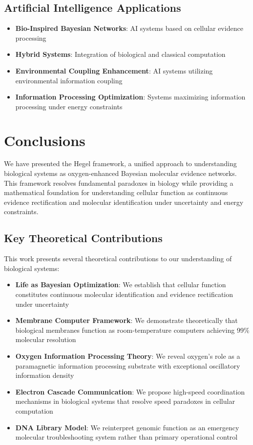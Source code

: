 \documentclass[12pt,a4paper]{article}
\begin{document}
\subsection{Artificial Intelligence Applications}

\begin{itemize}
\item \textbf{Bio-Inspired Bayesian Networks}: AI systems based on cellular evidence processing
\item \textbf{Hybrid Systems}: Integration of biological and classical computation
\item \textbf{Environmental Coupling Enhancement}: AI systems utilizing environmental information coupling
\item \textbf{Information Processing Optimization}: Systems maximizing information processing under energy constraints
\end{itemize}

\section{Conclusions}

We have presented the Hegel framework, a unified approach to understanding biological systems as oxygen-enhanced Bayesian molecular evidence networks. This framework resolves fundamental paradoxes in biology while providing a mathematical foundation for understanding cellular function as continuous evidence rectification and molecular identification under uncertainty and energy constraints.

\subsection{Key Theoretical Contributions}

This work presents several theoretical contributions to our understanding of biological systems:

\begin{itemize}
\item \textbf{Life as Bayesian Optimization}: We establish that cellular function constitutes continuous molecular identification and evidence rectification under uncertainty
\item \textbf{Membrane Computer Framework}: We demonstrate theoretically that biological membranes function as room-temperature computers achieving 99\% molecular resolution
\item \textbf{Oxygen Information Processing Theory}: We reveal oxygen's role as a paramagnetic information processing substrate with exceptional oscillatory information density
\item \textbf{Electron Cascade Communication}: We propose high-speed coordination mechanisms in biological systems that resolve speed paradoxes in cellular computation
\item \textbf{DNA Library Model}: We reinterpret genomic function as an emergency molecular troubleshooting system rather than primary operational control
\end{itemize}
\end{document}
